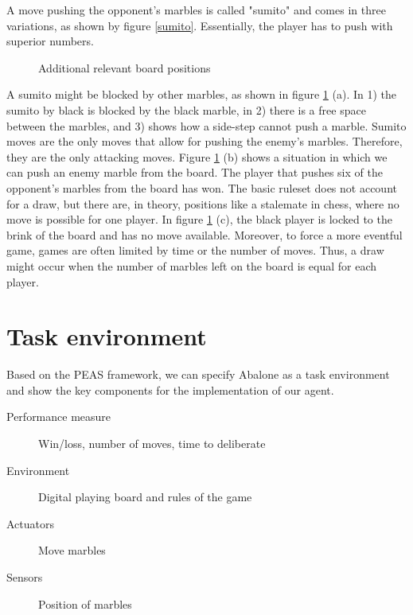 A move pushing the opponent's marbles is called "sumito" and comes in three variations, as shown by figure \ref{sumito}. Essentially, the player has to push with superior numbers.

\begin{figure}[!h]
    \centering
    \hfill
    \hfill
    \caption{Additional relevant board positions \cite{abalone_sa_abalone_nodate}}
    \label{additional_relevant_positions}
\end{figure}

A sumito might be blocked by other marbles, as shown in figure  \ref{additional_relevant_positions} (a). In 1) the sumito by black is blocked by the black marble, in 2) there is a free space between the marbles, and 3) shows how a side-step cannot push a marble. Sumito moves are the only moves that allow for pushing the enemy's marbles. Therefore, they are the only attacking moves. Figure \ref{additional_relevant_positions} (b) shows a situation in which we can push an enemy marble from the board. The player that pushes six of the opponent's marbles from the board has won. The basic ruleset does not account for a draw, but there are, in theory, positions like a stalemate in chess, where no move is possible for one player. In figure \ref{additional_relevant_positions} (c), the black player is locked to the brink of the board and has no move available. Moreover, to force a more eventful game, games are often limited by time or the number of moves. Thus, a draw might occur when the number of marbles left on the board is equal for each player.

\section{Task environment}
Based on the PEAS framework, we can specify Abalone as a task environment and show the key components for the implementation of our agent. \cite[p.107]{russell_artificial_2021}

\begin{description}
    \item[Performance measure] Win/loss, number of moves, time to deliberate
    \item[Environment] Digital playing board and rules of the game
    \item[Actuators] Move marbles
    \item[Sensors] Position of marbles
\end{description}

